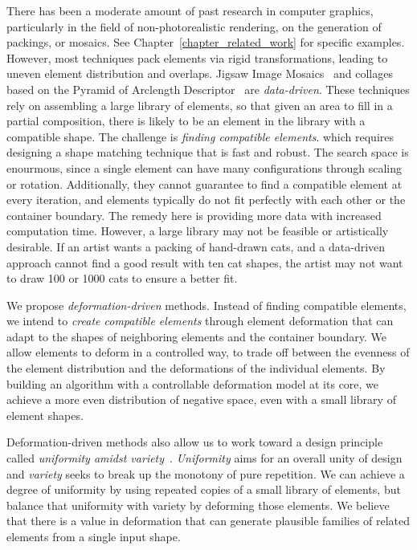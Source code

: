 There has been a moderate amount of past research in computer
graphics, particularly in the field of non-photorealistic rendering,
on the generation of packings, or mosaics.  
See Chapter~\ref{chapter_related_work} for specific examples.  
However,  most techniques pack elements via rigid transformations, leading to
uneven element distribution and overlaps.  
Jigsaw Image Mosaics~\cite{Kim2002} and collages based on the Pyramid of Arclength
Descriptor~\cite{Kwan2016} are \textit{data-driven}.
These techniques rely on assembling a large library of elements, so that given an
area to fill in a partial composition, there is likely to be an
element in the library with a compatible shape.  The challenge is 
\textit{finding compatible elements}. 
which requires designing a shape matching technique that is fast and robust.
The search space is enourmous, since a single element
can have many configurations through scaling or rotation.
Additionally, they cannot guarantee to find a compatible element
at every iteration, and
elements typically do not fit perfectly with each other 
or the container boundary.
The remedy here is providing more data with increased computation time.
However, a large library may not be feasible or artistically desirable.
If an artist wants a packing of hand-drawn cats, and a data-driven approach 
cannot find a good result with ten cat shapes, 
the artist may not want to draw 100 or 1000 cats to ensure a better fit.

We propose \textit{deformation-driven} methods.
Instead of finding compatible elements,
we intend to \textit{create compatible elements} through element deformation
that can adapt to the shapes of neighboring elements and the container boundary.
We allow elements to deform in a controlled way,
to trade off between the evenness of the element distribution and 
the deformations of the individual elements.
By building an algorithm with a controllable deformation model at its core, we achieve a
more even distribution of negative space, even with a small library of element shapes.

Deformation-driven methods also allow us to work toward a design principle called \textit{uniformity amidst variety}~\cite{Hutcheson1729, Gombrich}. 
\textit{Uniformity} aims for an overall unity of design and 
\textit{variety} seeks to break up the monotony of pure repetition.
We can achieve a degree of uniformity by using repeated copies of a small library of elements, but balance that uniformity with
variety by deforming those elements. 
We believe that there is a value in deformation that can generate plausible families of related elements from a single input shape.


